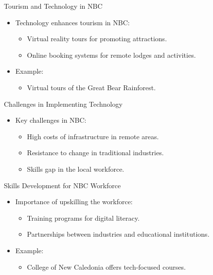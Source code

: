 \documentclass{beamer}
\begin{document}
\begin{frame}{Tourism and Technology in NBC}
    \begin{itemize}
        \item Technology enhances tourism in NBC:
        \begin{itemize}
            \item Virtual reality tours for promoting attractions.
            \item Online booking systems for remote lodges and activities.
        \end{itemize}
        \item Example:
        \begin{itemize}
            \item Virtual tours of the Great Bear Rainforest.
        \end{itemize}
    \end{itemize}
\end{frame}

\begin{frame}{Challenges in Implementing Technology}
    \begin{itemize}
        \item Key challenges in NBC:
        \begin{itemize}
            \item High costs of infrastructure in remote areas.
            \item Resistance to change in traditional industries.
            \item Skills gap in the local workforce.
        \end{itemize}
    \end{itemize}
\end{frame}

\begin{frame}{Skills Development for NBC Workforce}
    \begin{itemize}
        \item Importance of upskilling the workforce:
        \begin{itemize}
            \item Training programs for digital literacy.
            \item Partnerships between industries and educational institutions.
        \end{itemize}
        \item Example:
        \begin{itemize}
            \item College of New Caledonia offers tech-focused courses.
        \end{itemize}
    \end{itemize}
\end{frame}
\end{document}
